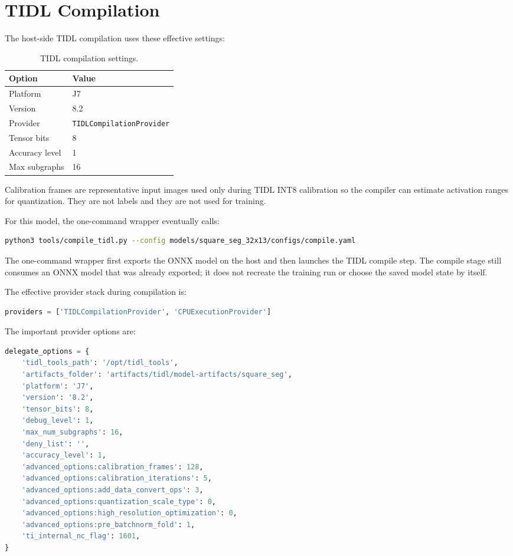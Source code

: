 \documentclass[11pt,a4paper]{article}
\begin{document}
\section{TIDL Compilation}

The host-side TIDL compilation uses these effective settings:

\begin{table}[H]
\centering
\caption{TIDL compilation settings.}
\begin{tabular}{ll}
\toprule
Option & Value \\
\midrule
Platform & J7 \\
Version & 8.2 \\
Provider & \texttt{TIDLCompilationProvider} \\
Tensor bits & 8 \\
Accuracy level & 1 \\
Max subgraphs & 16 \\
\bottomrule
\end{tabular}
\end{table}

Calibration frames are representative input images used only during TIDL INT8 calibration so the compiler can estimate activation ranges for quantization. They are not labels and they are not used for training.

For this model, the one-command wrapper eventually calls:

\begin{lstlisting}[language=bash]
python3 tools/compile_tidl.py --config models/square_seg_32x13/configs/compile.yaml
\end{lstlisting}

The one-command wrapper first exports the ONNX model on the host and then launches the TIDL compile step. The compile stage still consumes an ONNX model that was already exported; it does not recreate the training run or choose the saved model state by itself.

The effective provider stack during compilation is:

\begin{lstlisting}[language=Python]
providers = ['TIDLCompilationProvider', 'CPUExecutionProvider']
\end{lstlisting}

The important provider options are:

\begin{lstlisting}[language=Python]
delegate_options = {
    'tidl_tools_path': '/opt/tidl_tools',
    'artifacts_folder': 'artifacts/tidl/model-artifacts/square_seg',
    'platform': 'J7',
    'version': '8.2',
    'tensor_bits': 8,
    'debug_level': 1,
    'max_num_subgraphs': 16,
    'deny_list': '',
    'accuracy_level': 1,
    'advanced_options:calibration_frames': 128,
    'advanced_options:calibration_iterations': 5,
    'advanced_options:add_data_convert_ops': 3,
    'advanced_options:quantization_scale_type': 0,
    'advanced_options:high_resolution_optimization': 0,
    'advanced_options:pre_batchnorm_fold': 1,
    'ti_internal_nc_flag': 1601,
}
\end{lstlisting}
\end{document}
